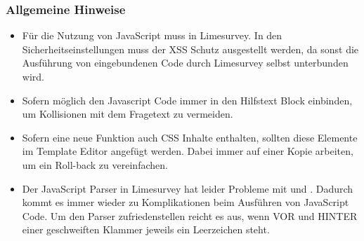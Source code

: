\subsubsection{Allgemeine Hinweise}
\begin{itemize}
\item Für die Nutzung von JavaScript muss in Limesurvey. In den Sicherheitseinstellungen muss der XSS Schutz ausgestellt werden, da sonst die Ausführung von eingebundenen Code durch Limesurvey selbst unterbunden wird.
\item Sofern möglich den Javascript Code immer in den Hilfstext Block einbinden, um Kollisionen mit dem Fragetext zu vermeiden.
\item Sofern eine neue Funktion auch CSS Inhalte enthalten, sollten diese Elemente im Template Editor angefügt werden. Dabei immer auf einer Kopie arbeiten, um ein Roll-back zu vereinfachen.
\item Der JavaScript Parser in Limesurvey hat leider Probleme mit { und } . Dadurch kommt es immer wieder zu Komplikationen beim Ausführen von JavaScript Code. Um den Parser zufriedenstellen reicht es aus, wenn VOR und HINTER einer geschweiften Klammer jeweils ein Leerzeichen steht.
\end{itemize}
